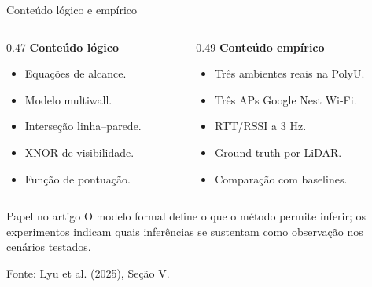 \documentclass[aspectratio=169,11pt]{beamer}
\newcommand{\slidecite}[1]{%
  \vfill
  {\color{mutedText}\footnotesize\raggedright Fonte: #1\par}
}
\begin{document}
\begin{frame}{Conteúdo lógico e empírico}
  \footnotesize
  \begin{columns}[T]
    \begin{column}{0.47\textwidth}
      \textbf{Conteúdo lógico}
      \begin{itemize}
        \item Equações de alcance.
        \item Modelo multiwall.
        \item Interseção linha--parede.
        \item XNOR de visibilidade.
        \item Função de pontuação.
      \end{itemize}
    \end{column}
    \begin{column}{0.49\textwidth}
      \textbf{Conteúdo empírico}
      \begin{itemize}
        \item Três ambientes reais na PolyU.
        \item Três APs Google Nest Wi-Fi.
        \item RTT/RSSI a 3 Hz.
        \item Ground truth por LiDAR.
        \item Comparação com baselines.
      \end{itemize}
    \end{column}
  \end{columns}

  \vspace{0.25cm}
  \begin{alertblock}{Papel no artigo}
    O modelo formal define o que o método permite inferir; os experimentos indicam quais inferências se sustentam como observação nos cenários testados.
  \end{alertblock}

  \slidecite{Lyu et al. (2025), Seção V.}
\end{frame}
\end{document}
